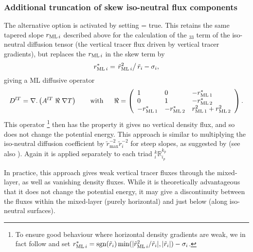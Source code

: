 \documentclass[../main/NEMO_manual]{subfiles}
\begin{document}
\subsubsection{Additional truncation of skew iso-neutral flux components}
\label{subsec:Gerdes-taper}

The alternative option is activated by setting  = true.
This retains the same tapered slope $r_{\mathrm{ML}\,i}$  described above for the calculation of the $_{33}$ term of
the iso-neutral diffusion tensor (the vertical tracer flux driven by vertical tracer gradients),
but replaces the $r_{\mathrm{ML}\,i}$ in the skew term by
\begin{equation}
  \label{eq:rm*}
  r_{\mathrm{ML}\,i}^*=\left.\tilde{r}_{\mathrm{ML}\,i}^2\right/\tilde{r}_i-\sigma_i,
\end{equation}
giving a ML diffusive operator
\[
  D^{lT}=\nabla {\rm {\bf .}}\left( {A^{lT}\;\Re \;\nabla T} \right) \qquad
  \mbox{with}\quad \;\;\Re =\left( {{
        \begin{array}{*{20}c}
          1 \hfill & 0 \hfill & {-\rML[1]^*}\hfill \\
          0 \hfill & 1 \hfill & {-\rML[2]^*} \hfill \\
          {-\rML[1]^*}\hfill &   {-\rML[2]^*} \hfill & {\rML[1]^2+\rML[2]^2} \hfill \\
        \end{array}
      }} \right).
\]
This operator
\footnote{
  To ensure good behaviour where horizontal density gradients are weak,
  we in fact follow \citet{Gerdes1991} and
  set $r_{\mathrm{ML}\,i}^*=\mathrm{sgn}(\tilde{r}_i)\min(|\tilde{r}_{\mathrm{ML}\,i}^2/\tilde{r}_i|,|\tilde{r}_i|)-\sigma_i$.
}
then has the property it gives no vertical density flux, and so does not change the potential energy.
This approach is similar to multiplying the iso-neutral diffusion coefficient by
$\tilde{r}_{\mathrm{max}}^{-2}\tilde{r}_i^{-2}$ for steep slopes,
as suggested by \citet{Gerdes1991} (see also \citet{Griffies_Bk04}).
Again it is applied separately to each triad $_i^k\mathbb{R}_{i_p}^{k_p}$

In practice, this approach gives weak vertical tracer fluxes through the mixed-layer,
as well as vanishing density fluxes.
While it is theoretically advantageous that it does not change the potential energy,
it may give a discontinuity between the fluxes within the mixed-layer (purely horizontal) and
just below (along iso-neutral surfaces).
\end{document}
